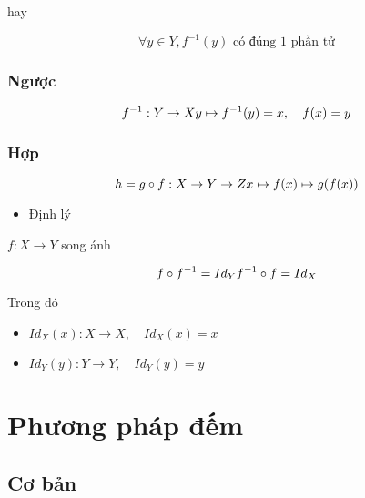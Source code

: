 \documentclass[11pt]{article}
\providecommand{\tightlist}{%
      \setlength{\itemsep}{0pt}\setlength{\parskip}{0pt}}
\begin{document}
hay

\[
\forall y \in Y, f^{-1}(y) \text{ có đúng 1 phần tử}
\]

    \subsubsection{Ngược}\label{ngux1b0ux1ee3c}

    \[
f^{-1} : Y \to X \\
y \mapsto f^{-1} (y) = x, \quad f(x) = y
\]

    \subsubsection{Hợp}\label{hux1ee3p}

    \[
h = g \circ f : X \to Y \to Z \\
x \mapsto f(x) \mapsto g(f(x))
\]

    \begin{itemize}
\tightlist
\item
  Định lý
\end{itemize}

\(f: X \to Y\) song ánh

\[
f \circ f^{-1} = I d_Y \\
f^{-1} \circ f = I d_X
\]

Trong đó

\begin{itemize}
\item
  \(Id_X(x) : X \to X, \quad Id_X(x) = x\)
\item
  \(Id_Y(y) : Y \to Y, \quad Id_Y(y) = y\)
\end{itemize}

    \section{Phương pháp đếm}\label{phux1b0ux1a1ng-phuxe1p-ux111ux1ebfm}

    \subsection{Cơ bản}\label{cux1a1-bux1ea3n}
\end{document}
